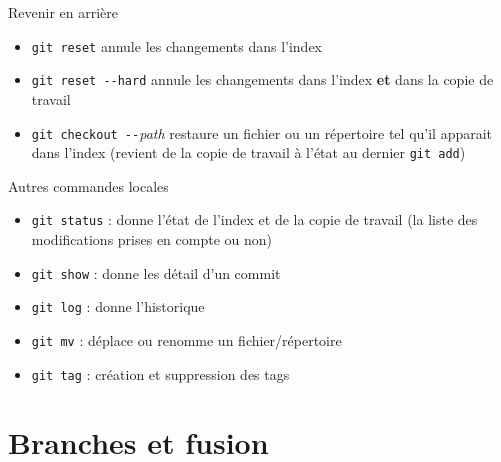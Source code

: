 \begin{frame}[fragile]{%
\protect\hypertarget{revenir-en-arriuxe8re}{%
Revenir en arrière}}

\begin{itemize}
\tightlist
\item
  \texttt{git\ reset} annule les changements dans l’index
\item
  \texttt{git\ reset\ -\/-hard} annule les changements dans l’index
  \textbf{et} dans la copie de travail
\item
  \texttt{git\ checkout\ -\/-}\emph{path} restaure un fichier ou un
  répertoire tel qu’il apparait dans l’index (revient de la copie de
  travail à l’état au dernier \texttt{git\ add})
\end{itemize}

\end{frame}

\begin{frame}[fragile]{%
\protect\hypertarget{autres-commandes-locales}{%
Autres commandes locales}}

\begin{itemize}
\tightlist
\item
  \texttt{git\ status} : donne l’état de l’index et de la copie de
  travail (la liste des modifications prises en compte ou non)
\item
  \texttt{git\ show} : donne les détail d’un commit
\item
  \texttt{git\ log} : donne l’historique
\item
  \texttt{git\ mv} : déplace ou renomme un fichier/répertoire
\item
  \texttt{git\ tag} : création et suppression des tags
\end{itemize}

\end{frame}

\hypertarget{branches-et-fusion}{%
\section{Branches et fusion}\label{branches-et-fusion}}

